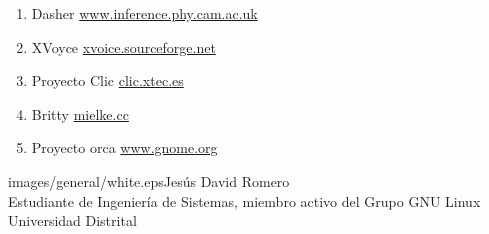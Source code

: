 \begin{multicols}{2}
\begin{enumerate}
\item Dasher \href{http://www.inference.phy.cam.ac.uk/dasher}{www.inference.phy.cam.ac.uk}

\item XVoyce \href{http://xvoice.sourceforge.net/}{xvoice.sourceforge.net}

\item Proyecto Clic \href{http://clic.xtec.es/es/jclic}{clic.xtec.es}

\item Britty \href{http://mielke.cc/brltty/index.html}{mielke.cc}

\item Proyecto orca \href{http://www.gnome.org/projets/orca}{www.gnome.org}



\end{enumerate}

\begin{biografia}{images/general/white.eps}{Jesús David Romero} 
\\
Estudiante de Ingeniería de Sistemas, miembro activo del Grupo GNU Linux Universidad Distrital
\end{biografia}

\raggedcolumns
\pagebreak


\end{multicols}

\clearpage
\pagebreak
